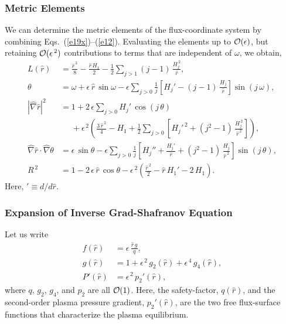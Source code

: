 \documentclass[12pt,prb,aps]{revtex4-1}
\begin{document}
\subsubsection{Metric Elements}\label{metric}
We can determine the metric elements of the flux-coordinate system by combining Eqs.~(\ref{e19x})--(\ref{e12}).
Evaluating the elements up to ${\cal O}(\epsilon)$, but retaining ${\cal O}(\epsilon^{\,2})$ contributions to terms that are independent of
$\omega$, we obtain,\cite{tj,tj1}
\begin{align}\label{epdef}
L(\hat{r})&= \frac{\hat{r}^{\,3}}{8} -\frac{\hat{r}\,H_1}{2}-\frac{1}{2}\sum_{j>1}(j-1)\,\frac{H_j^{\,2}}{\hat{r}},\\[0.5ex]
\theta &= \omega+\epsilon\,\hat{r}\,\sin\omega - \epsilon\sum_{j>0}\frac{1}{j}\left[H_j'-(j-1)\,\frac{H_j}{\hat{r}}\right]\sin(j\,\omega),\label{e22y}\\[0.5ex]
|\hat{\nabla} \hat{r}|^2 &= 1 +2\,\epsilon\sum_{j>0}H_j'\,\cos(j\,\theta)  \nonumber\\[0.5ex]
&\phantom{=}+\epsilon^{\,2}\left(\frac{3\,\hat{r}^{\,2}}{4}-H_1+
\frac{1}{2}\sum_{j>0}\left[H_j'^{\,2}+(j^2-1)\,\frac{H_j^{\,2}}{\hat{r}^{\,2}}\right]\right),\label{e19}\\[0.5ex]
\hat{\nabla}\hat{r}\cdot\hat{\nabla}\theta&=\epsilon\,\sin\theta
-\epsilon\sum_{j>0}\frac{1}{j}\left[H_j''+\frac{H_j'}{\hat{r}}+(j^2-1)\,\frac{H_j}{\hat{r}^{\,2}}\right]\sin(j\,\theta),\label{e20uu}
\\[0.5ex]
R^{\,2}&= 1-2\,\epsilon\,\hat{r}\,\cos\theta -\epsilon^{\,2}\left(\frac{\hat{r}^{\,2}}{2}-\hat{r}\,H_1'-2\,H_1\right).\label{e25a}
\end{align}
Here, $'\equiv d/d\hat{r}$.

\subsubsection{Expansion of Inverse Grad-Shafranov Equation}\label{exp}
Let us write\,\cite{tj,tj1}
\begin{align}\label{e26v}
f(\hat{r})&= \epsilon\,\frac{\hat{r}\,g}{q},\\[0.5ex]
g(\hat{r}) &= 1+ \epsilon^{\,2}\,g_2(\hat{r}) + \epsilon^{\,4}\,g_4(\hat{r}),\label{e27v}\\[0.5ex]
P'(\hat{r}) &= \epsilon^{\,2}\,p_2'(\hat{r}),\label{eq1}
\end{align}
where $q$,  $g_2$, $g_4$, and $p_2$ are all ${\cal O}(1)$. Here, the safety-factor, $q(\hat{r})$, and the second-order plasma
pressure gradient, $p_2'(\hat{r})$, are the two free flux-surface functions that characterize the plasma equilibrium.
\end{document}
